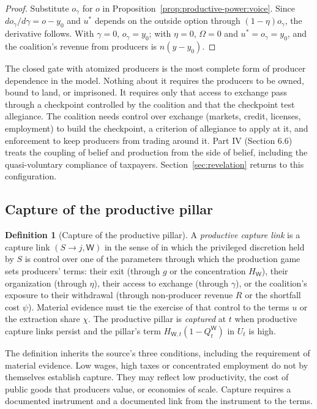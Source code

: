 \documentclass[11pt,letterpaper]{article}
\theoremstyle{definition}
\newtheorem{definition}[theorem]{Definition}
\theoremstyle{remark}
\newcommand{\pW}{\mathsf{W}}
\newcommand{\QW}{Q^{\pW}}
\newcommand{\HW}{H_{\pW}}
\begin{document}
\begin{proof}
Substitute $o_\gamma$ for $o$ in Proposition~\ref{prop:productive-power:voice}. Since $do_\gamma/d\gamma=o-y_0$ and $u^*$ depends on the outside option through $(1-\eta)o_\gamma$, the derivative follows. With $\gamma=0$, $o_\gamma=y_0$; with $\eta=0$, $\Omega=0$ and $u^*=o_\gamma=y_0$, and the coalition's revenue from producers is $n(y-y_0)$.
\end{proof}

The closed gate with atomized producers is the most complete form of producer dependence in the model. Nothing about it requires the producers to be owned, bound to land, or imprisoned. It requires only that access to exchange pass through a checkpoint controlled by the coalition and that the checkpoint test allegiance. The coalition needs control over exchange (markets, credit, licenses, employment) to build the checkpoint, a criterion of allegiance to apply at it, and enforcement to keep producers from trading around it. Part IV (Section 6.6) treats the coupling of belief and production from the side of belief, including the quasi-voluntary compliance of taxpayers. Section~\ref{sec:revelation} returns to this configuration.

\subsection{Capture of the productive pillar}

\begin{definition}[Capture of the productive pillar]
\label{def:productive-power:w-capture}
A \emph{productive capture link} is a capture link $(S\to j,\pW)$ in the sense of \citet{largo2026hbs} in which the privileged discretion held by $S$ is control over one of the parameters through which the production game sets producers' terms: their exit (through $g$ or the concentration $\HW$), their organization (through $\eta$), their access to exchange (through $\gamma$), or the coalition's exposure to their withdrawal (through non-producer revenue $R$ or the shortfall cost $\psi$). Material evidence must tie the exercise of that control to the terms $u$ or the extraction share $\chi$. The productive pillar is \emph{captured} at $t$ when productive capture links persist and the pillar's term $H_{\pW,t}(1-\QW_t)$ in $U_t$ is high.
\end{definition}

The definition inherits the source's three conditions, including the requirement of material evidence. Low wages, high taxes or concentrated employment do not by themselves establish capture. They may reflect low productivity, the cost of public goods that producers value, or economies of scale. Capture requires a documented instrument and a documented link from the instrument to the terms.
\end{document}
